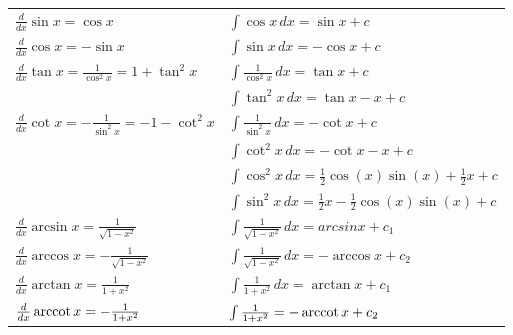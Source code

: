 \begin{longtable}{ll}
        \midrule
        $\frac{d}{dx} \sin{x} = \cos{x}$ &
        $\int \cos{x}\,dx = \sin{x} + c$
        \\
        $\frac{d}{dx} \cos{x} = -\sin{x}$ &
        $\int \sin{x}\,dx = -\cos{x} + c$
        \\
        \multirow{2}{*}{$\frac{d}{dx} \tan{x} = \frac{1}{\cos^2{x}} = 1 + \tan^2{x}$} &
        $\int \frac{1}{\cos^2{x}}\,dx = \tan{x} + c$ \\* &
        $\int \tan^2{x}\,dx = \tan{x}-x + c$
        \\
        \multirow{2}{*}{$\frac{d}{dx} \cot{x} = -\frac{1}{\sin^2{x}} = -1 - \cot^2{x}$} &
        $\int \frac{1}{\sin^2{x}}\,dx = -\cot{x} + c$ \\* &
        $\int \cot^2{x}\,dx = -\cot{x}-x + c$
        \\
        \midrule
        &
        $\int \cos^2{x}\,dx = \frac{1}{2}\cos{(x)}\sin{(x)}+\frac{1}{2}x + c$
        \\
        &
        $\int \sin^2{x}\,dx = \frac{1}{2}x-\frac{1}{2}\cos{(x)}\sin{(x)} + c$
        \\

        \midrule
        $\frac{d}{dx} \arcsin{x} = \frac{1}{\sqrt{1-x^2}}$ &
        $\int \frac{1}{\sqrt{1-x^2}}\,dx = arcsin{x} + c_1$
        \\
        $\frac{d}{dx} \arccos{x} = -\frac{1}{\sqrt{1-x^2}}$ &
        $\int \frac{1}{\sqrt{1-x^2}}\,dx = -\arccos{x} + c_2$
        \\
        $\frac{d}{dx} \arctan{x} = \frac{1}{1+x^2}$ &
        $\int \frac{1}{1+x^2}\,dx = \arctan{x} + c_1$
        \\
        $\frac{d}{dx} \operatorname{arccot}{x} = -\frac{1}{1+x^2} $ &
        $\int \frac{1}{1+x^2} = -\operatorname{arccot}{x} + c_2$
        \\
     

\end{longtable}
